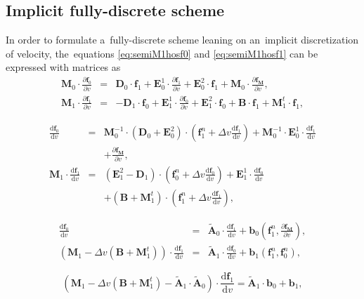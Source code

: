 \documentclass[preprint,12pt]{elsarticle}
\newcommand{\pdv}[2]{\frac{\partial{#1}}{\partial{#2}}}
\newcommand{\vect}[1]{\boldsymbol{#1}}
\newcommand{\matr}[1]{\mathbf{#1}}
\newcommand{\dI}{\text{d}}
\newcommand{\odv}[2]{\frac{\dI #1}{\dI #2}}
\newcommand{\ddv}[2]{\odv{#1}{#2}}
\newcommand{\vmag}{v}
\newcommand{\fM}{f_M}
\newcommand{\vfzero}{\vect{f}_0}
\newcommand{\fone}{\vect{f}_1}
\begin{document}
\subsection{Implicit fully-discrete scheme}\label{sec:impl_fullydiscrete_scheme}
In order to formulate a~fully-discrete scheme leaning on an~implicit 
discretization of velocity, the~equations \eqref{eq:semiM1hosf0} and 
\eqref{eq:semiM1hosf1} can be expressed with matrices as
\begin{eqnarray}
  \matr{M}_0 \cdot \pdv{\vfzero}{\vmag}  
  &=& 
  \matr{D}_0 \cdot \fone
  + \matr{E}_0^1 \cdot \pdv{\fone}{\vmag} + \matr{E}_0^2 \cdot \fone
  + \matr{M}_0 \cdot \pdv{\vect{\fM}}{\vmag} ,  
  \nonumber\\
  \matr{M}_1 \cdot \pdv{\fone}{\vmag}  
  &=& 
  - \matr{D}_1 \cdot \vfzero 
  + \matr{E}_1^1 \cdot \pdv{\vfzero}{\vmag}
  + \matr{E}_1^2 \cdot \vfzero
  + \matr{B} \cdot \fone
  + \matr{M}^t_1 \cdot \fone ,
  \nonumber
\end{eqnarray}

\begin{eqnarray}
  \ddv{\vfzero}{\vmag}  
  &=& 
  \matr{M}_0^{-1} \cdot \left(\matr{D}_0 + \matr{E}_0^2 \right) 
  \cdot \left(\fone^n + \Delta \vmag \ddv{\fone}{\vmag} \right)
  + \matr{M}_0^{-1} \cdot \matr{E}_0^1 \cdot \ddv{\fone}{\vmag} \nonumber\\
  && + \pdv{\vect{\fM}}{\vmag} ,  
  \nonumber\\
  \matr{M}_1 \cdot \ddv{\fone}{\vmag}  
  &=& 
  \left( \matr{E}_1^2 - \matr{D}_1 \right) 
  \cdot \left(\vfzero^n + \Delta\vmag \ddv{\vfzero}{\vmag} \right) 
  + \matr{E}_1^1 \cdot \ddv{\vfzero}{\vmag} \nonumber\\
  && + \left( \matr{B} + \matr{M}^t_1 \right)  
  \cdot \left(\fone^n + \Delta \vmag \ddv{\fone}{\vmag} \right) ,
  \nonumber
\end{eqnarray}

\begin{eqnarray}
  \ddv{\vfzero}{\vmag}  
  &=& 
  \matr{\tilde{A}}_0 \cdot \ddv{\fone}{\vmag}
  + \vect{b}_0\left(\fone^n, \pdv{\vect{\fM}}{\vmag}\right) ,  
  \label{eq:df0dv} \\
  \left( \matr{M}_1 
  - \Delta \vmag \left( \matr{B} + \matr{M}^t_1 \right) \right) 
  \cdot \ddv{\fone}{\vmag}  
  &=& 
  \matr{\tilde{A}}_1 \cdot \ddv{\vfzero}{\vmag}  
  + \vect{b}_1 \left( \fone^n, \vfzero^n \right) , 
  \label{eq:df1dvdf0dv}
\end{eqnarray}

\begin{equation}
  \left( \matr{M}_1 
  - \Delta \vmag \left( \matr{B} + \matr{M}^t_1 \right) 
  - \matr{\tilde{A}}_1 \cdot \matr{\tilde{A}}_0 \right) 
  \cdot \ddv{\fone}{\vmag}  
  = 
  \matr{\tilde{A}}_1 
  \cdot \vect{b}_0 + \vect{b}_1 , 
  \label{eq:df1dv}
\end{equation}
\end{document}
